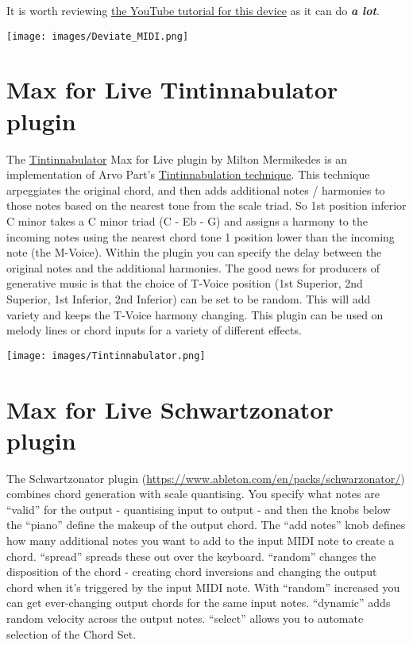 \documentclass[
  12pt,
  letterpaper,
  oneside,
  open=any]{scrbook}
\begin{document}
It is worth reviewing \href{https://youtu.be/4WwKGUV2H4I}{the YouTube
tutorial for this device} as it can do \textbf{\emph{a lot}}.

\texttt{[image: images/Deviate\_MIDI.png]}

\section{Max for Live Tintinnabulator
plugin}\label{max-for-live-tintinnabulator-plugin}

The
\href{https://maxforlive.com/library/device/7569/tintinnabulator}{Tintinnabulator}
Max for Live plugin by Milton Mermikedes is an implementation of Arvo
Part's
\href{https://en.wikipedia.org/wiki/Tintinnabuli}{Tintinnabulation
technique}. This technique arpeggiates the original chord, and then adds
additional notes / harmonies to those notes based on the nearest tone
from the scale triad. So 1st position inferior C minor takes a C minor
triad (C - Eb - G) and assigns a harmony to the incoming notes using the
nearest chord tone 1 position lower than the incoming note (the
M-Voice). Within the plugin you can specify the delay between the
original notes and the additional harmonies. The good news for producers
of generative music is that the choice of T-Voice position (1st
Superior, 2nd Superior, 1st Inferior, 2nd Inferior) can be set to be
random. This will add variety and keeps the T-Voice harmony changing.
This plugin can be used on melody lines or chord inputs for a variety of
different effects.

\texttt{[image: images/Tintinnabulator.png]}

\section{Max for Live Schwartzonator
plugin}\label{max-for-live-schwartzonator-plugin}

The Schwartzonator plugin
(\url{https://www.ableton.com/en/packs/schwarzonator/}) combines chord
generation with scale quantising. You specify what notes are ``valid''
for the output - quantising input to output - and then the knobs below
the ``piano'' define the makeup of the output chord. The ``add notes''
knob defines how many additional notes you want to add to the input MIDI
note to create a chord. ``spread'' spreads these out over the keyboard.
``random'' changes the disposition of the chord - creating chord
inversions and changing the output chord when it's triggered by the
input MIDI note. With ``random'' increased you can get ever-changing
output chords for the same input notes. ``dynamic'' adds random velocity
across the output notes. ``select'' allows you to automate selection of
the Chord Set.
\end{document}
